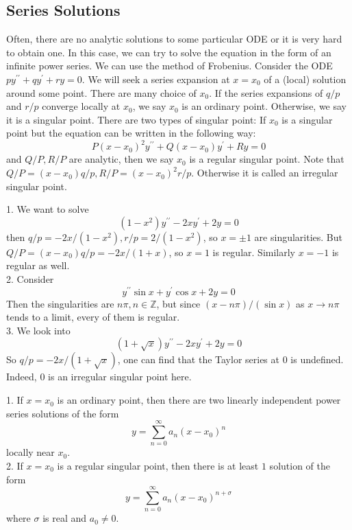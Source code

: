 \subsection{Series Solutions}
Often, there are no analytic solutions to some particular ODE or it is very hard to obtain one.
In this case, we can try to solve the equation in the form of an infinite power series.
We can use the method of Frobenius.
Consider the ODE $py^{\prime\prime}+qy^\prime+ry=0$.
We will seek a series expansion at $x=x_0$ of a (local) solution around some point.
There are many choice of $x_0$.
If the series expansions of $q/p$ and $r/p$ converge locally at $x_0$, we say $x_0$ is an ordinary point.
Otherwise, we say it is a singular point.
There are two types of singular point:
If $x_0$ is a singular point but the equation can be written in the following way:
$$P(x-x_0)^2y^{\prime\prime}+Q(x-x_0)y^\prime+Ry=0$$
and $Q/P,R/P$ are analytic, then we say $x_0$ is a regular singular point.
Note that $Q/P=(x-x_0)q/p,R/P=(x-x_0)^2r/p$.
Otherwise it is called an irregular singular point.
\begin{example}
    1. We want to solve
    $$(1-x^2)y^{\prime\prime}-2xy^\prime+2y=0$$
    then $q/p=-2x/(1-x^2),r/p=2/(1-x^2)$, so $x=\pm 1$ are singularities.
    But $Q/P=(x-x_0)q/p=-2x/(1+x)$, so $x=1$ is regular.
    Similarly $x=-1$ is regular as well.\\
    2. Consider
    $$y^{\prime\prime}\sin x+y^\prime\cos x+2y=0$$
    Then the singularities are $n\pi,n\in\mathbb Z$, but since $(x-n\pi)/(\sin x)$ as $x\to n\pi$ tends to a limit, every of them is regular.\\
    3. We look into
    $$(1+\sqrt{x})y^{\prime\prime}-2xy^\prime+2y=0$$
    So $q/p=-2x/(1+\sqrt{x})$, one can find that the Taylor series at $0$ is undefined.
    Indeed, $0$ is an irregular singular point here.
\end{example}
\begin{theorem}
    1. If $x=x_0$ is an ordinary point, then there are two linearly independent power series solutions of the form
    $$y=\sum_{n=0}^\infty a_n(x-x_0)^{n}$$
    locally near $x_0$.\\
    2. If $x=x_0$ is a regular singular point, then there is at least $1$ solution of the form
    $$y=\sum_{n=0}^\infty a_n(x-x_0)^{n+\sigma}$$
    where $\sigma$ is real and $a_0\neq 0$.
\end{theorem}

